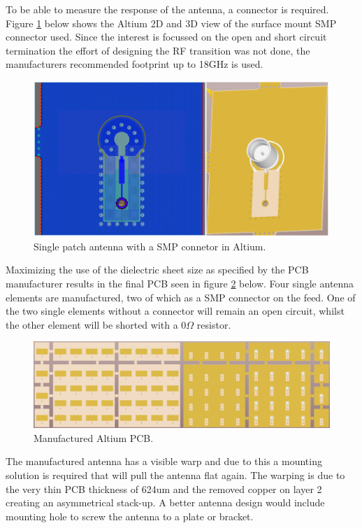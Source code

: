 To be able to measure the response of the antenna, a connector is required. Figure \ref{fig:chp3_Altium_single_SMP} below shows the Altium 2D and 3D view of the surface mount SMP connector used. Since the interest is focussed on the open and short circuit termination the effort of designing the RF transition was not done, the manufacturers recommended footprint up to 18GHz is used.

    \begin{figure}[H]
    \centering
    \includegraphics[width=0.5\linewidth]{Figures/chp3_Altium_single_SMP.png}
    \caption{Single patch antenna with a SMP connetor in Altium.}
    \label{fig:chp3_Altium_single_SMP}
    \end{figure}

Maximizing the use of the dielectric sheet size as specified by the PCB manufacturer results in the final PCB seen in figure \ref{fig:chp3_Altium_all} below. Four single antenna elements are manufactured, two of which as a SMP connector on the feed. One of the two single elements without a connector will remain an open circuit, whilst the other element will be shorted with a 0$\Omega$ resistor.

    \begin{figure}[H]
    \centering
    \includegraphics[width=0.8\linewidth]{Figures/chp3_Altium_all.png}
    \caption{Manufactured Altium PCB.}
    \label{fig:chp3_Altium_all}
    \end{figure}

The manufactured antenna has a visible warp and due to this a mounting solution is required that will pull the antenna flat again. The warping is due to the very thin PCB thickness of 624um and the removed copper on layer 2 creating an asymmetrical stack-up. A better antenna design would include mounting hole to screw the antenna to a plate or bracket.

